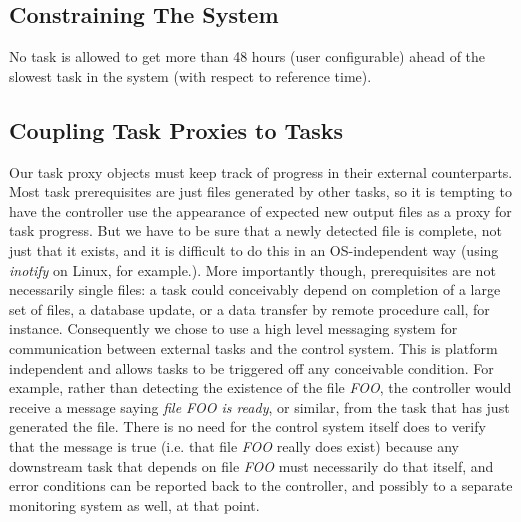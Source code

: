 \documentclass[11pt,a4paper]{article}
\begin{document}
\subsection{Constraining The System}

No task is allowed to get more than 48 hours (user configurable) ahead
of the slowest task in the system (with respect to reference time).


\subsection{Coupling Task Proxies to Tasks} 

Our task proxy objects must keep track of progress in their external
counterparts. Most task prerequisites are just files generated by other
tasks, so it is tempting to have the controller use the appearance of
expected new output files as a proxy for task progress. But we have to
be sure that a newly detected file is complete, not just that it exists,
and it is difficult to do this in an OS-independent way (using {\em
inotify} on Linux, for example.). 
More importantly though, prerequisites are not necessarily single files:
a task could conceivably depend on completion of a large set of files, a
database update, or a data transfer by remote procedure call, for
instance. Consequently we chose to use a high level messaging system for
communication between external tasks and the control system. This is
platform independent and allows tasks to be triggered off any
conceivable condition. For example, rather than detecting the existence
of the file {\em FOO}, the controller would receive a message saying
{\em file FOO is ready}, or similar, from the task that has
just generated the file.  There is no need for the control system itself
does to verify that the message is true (i.e. that file {\em FOO}
really does exist) because any downstream task that
depends on file {\em FOO} must necessarily do that itself, and error 
conditions can be reported back to the controller, and possibly to a
separate monitoring system as well, at that point.
\end{document}
